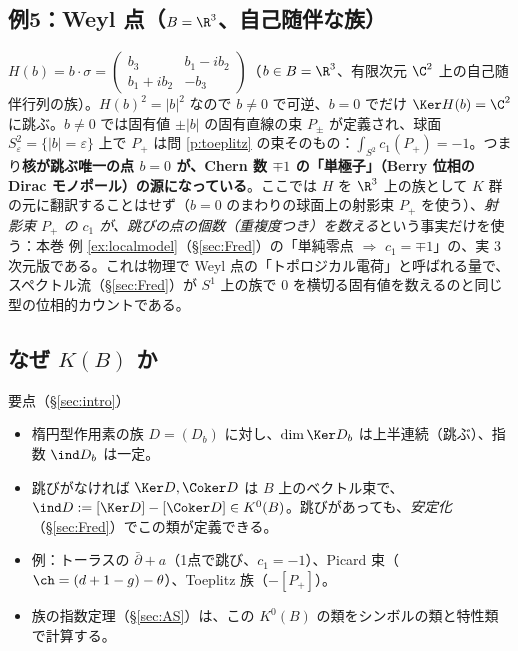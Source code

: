 \subsection{例5：Weyl 点（$B=\R^3$、自己随伴な族）}
$H(b)=b\cdot\sigma=\begin{pmatrix}b_3&b_1-ib_2\\b_1+ib_2&-b_3\end{pmatrix}$（$b\in B=\R^3$、有限次元 $\C^2$ 上の自己随伴行列の族）。$H(b)^2=|b|^2$ なので $b\ne0$ で可逆、$b=0$ でだけ $\Ker H(b)=\C^2$ に跳ぶ。$b\neq0$ では固有値 $\pm|b|$ の固有直線の束 $P_\pm$ が定義され、球面 $S^2_\varepsilon=\{|b|=\varepsilon\}$ 上で $P_+$ は問 \ref{p:toeplitz} の束そのもの：$\int_{S^2}c_1(P_+)=-1$。つまり\textbf{核が跳ぶ唯一の点 $b=0$ が、Chern 数 $\mp1$ の「単極子」（Berry 位相の Dirac モノポール）の源になっている}。ここでは $H$ を $\R^3$ 上の族として $K$ 群の元に翻訳することはせず（$b=0$ のまわりの球面上の射影束 $P_+$ を使う）、\emph{射影束 $P_+$ の $c_1$ が、跳びの点の個数（重複度つき）を数える}という事実だけを使う：本巻 例 \ref{ex:localmodel}（\S\ref{sec:Fred}）の「単純零点 $\Rightarrow$ $c_1=\mp1$」の、実 3 次元版である。これは物理で Weyl 点の「トポロジカル電荷」と呼ばれる量で、スペクトル流（\S\ref{sec:Fred}）が $S^1$ 上の族で $0$ を横切る固有値を数えるのと同じ型の位相的カウントである。

\subsection{なぜ $K(B)$ か}
\begin{keybox}{要点（\S\ref{sec:intro}）}
\begin{itemize}
\item 楕円型作用素の族 $D=(D_b)$ に対し、$\dim\Ker D_b$ は上半連続（跳ぶ）、指数 $\ind D_b$ は一定。
\item 跳びがなければ $\Ker D,\Coker D$ は $B$ 上のベクトル束で、$\ind D:=[\Ker D]-[\Coker D]\in K^0(B)$。跳びがあっても、\emph{安定化}（\S\ref{sec:Fred}）でこの類が定義できる。
\item 例：トーラスの $\bar\partial+a$（1点で跳び、$c_1=-1$）、Picard 束（$\ch=(d+1-g)-\theta$）、Toeplitz 族（$-[P_+]$）。
\item 族の指数定理（\S\ref{sec:AS}）は、この $K^0(B)$ の類をシンボルの類と特性類で計算する。
\end{itemize}
\end{keybox}

